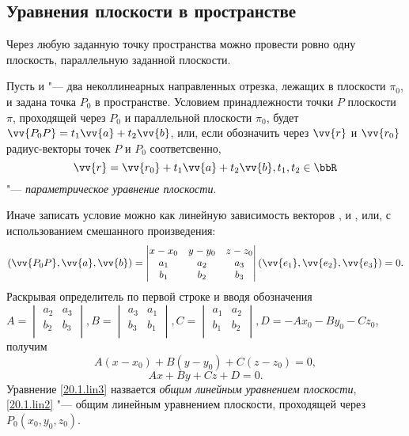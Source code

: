 \subsection{Уравнения плоскости в пространстве}
\begin{axiome}
Через любую заданную точку пространства можно провести ровно одну плоскость, параллельную заданной плоскости.
\end{axiome}

Пусть  и  "--- два неколлинеарных направленных отрезка, лежащих в плоскости $\pi_0$, и задана точка $P_0$ в пространстве. Условием принадлежности точки $P$ плоскости $\pi$, проходящей через $P_0$ и параллельной плоскости $\pi_0$, будет $\vv{P_0P}=t_1\vv{a}+t_2\vv{b}$, или, если обозначить через $\vv{r}$ и $\vv{r_0}$ радиус-векторы точек $P$ и $P_0$ соответсвенно,
\begin{equation}\label{20.1.par3}
\vv{r}=\vv{r_0}+t_1\vv{a}+t_2\vv{b}, t_1,t_2 \in \bbR
\end{equation}
"--- \textit{параметрическое уравнение плоскости}.

Иначе записать условие можно как линейную зависимость векторов ,  и , или, с использованием смешанного произведения:
\begin{equation}\label{20.1.mix1}
(\vv{P_0P},\vv{a}, \vv{b})=\begin{vmatrix}
x-x_0 & y-y_0 & z-z_0 \\
a_1 & a_2 & a_3 \\
b_1 & b_2 & b_3 \\
\end{vmatrix}(\vv{e_1},\vv{e_2},\vv{e_3})=0.
\end{equation}
Раскрывая определитель по первой строке и вводя обозначения $A=\begin{vmatrix}
a_2 & a_3 \\
b_2 & b_3 \\
\end{vmatrix}, B=\begin{vmatrix}
a_3 & a_1 \\
b_3 & b_1 \\
\end{vmatrix}, C=\begin{vmatrix}
a_1 & a_2 \\
b_1 & b_2 \\
\end{vmatrix}, D=-Ax_0-By_0-Cz_0$, получим
\begin{equation}\label{20.1.lin2}
A(x-x_0)+B(y-y_0)+C(z-z_0)=0,
\end{equation}
\begin{equation}\label{20.1.lin3}
Ax+By+Cz+D=0.
\end{equation}
Уравнение \eqref{20.1.lin3} назвается \textit{общим линейным уравнением плоскости}, \eqref{20.1.lin2} "--- общим линейным уравнением плоскости, проходящей через $P_0(x_0,y_0,z_0)$.


